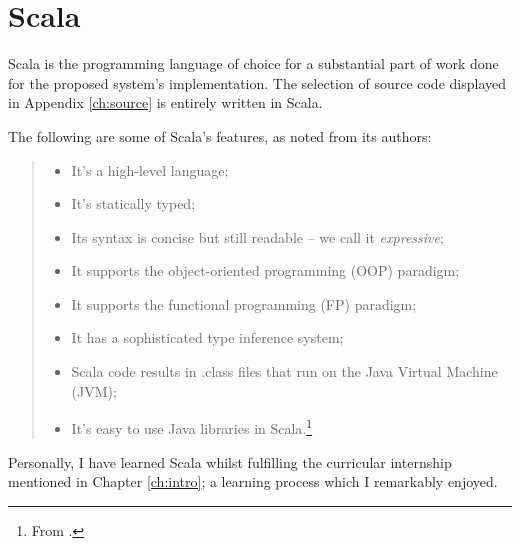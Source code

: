 \section{Scala}

Scala is the programming language of choice for a substantial part of work done for the proposed system's implementation.
The selection of source code displayed in Appendix \ref{ch:source} is entirely written in Scala.

The following are some of Scala's features, as noted from its authors:
\begin{quote}
	\begin{itemize}
		\item It’s a high-level language;
		\item It’s statically typed;
		\item Its syntax is concise but still readable -- we call it \emph{expressive};
		\item It supports the object-oriented programming (OOP) paradigm;
		\item It supports the functional programming (FP) paradigm;
		\item It has a sophisticated type inference system;
		\item Scala code results in .class files that run on the Java Virtual Machine (JVM);
		\item It’s easy to use Java libraries in Scala.\footnote{%
			From \cite[Prelude: A Taste of Scala]{scala-book}.
		}
	\end{itemize}
\end{quote}

Personally, I have learned Scala whilst fulfilling the curricular internship mentioned in Chapter \ref{ch:intro}; a learning process which I remarkably enjoyed.

